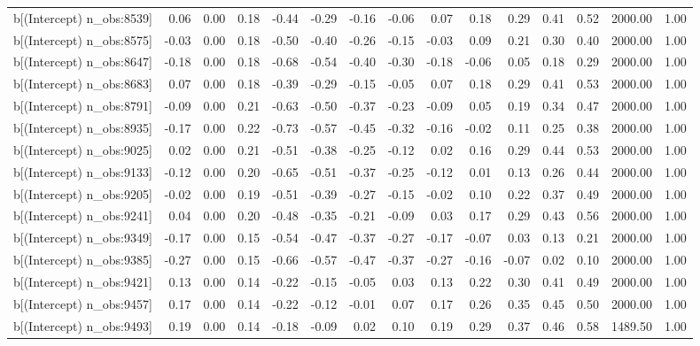 \begin{table}[ht]
\begin{tabular}{rrrrrrrrrrrrrrr}
  b[(Intercept) n\_obs:8539] & 0.06 & 0.00 & 0.18 & -0.44 & -0.29 & -0.16 & -0.06 & 0.07 & 0.18 & 0.29 & 0.41 & 0.52 & 2000.00 & 1.00 \\ 
  b[(Intercept) n\_obs:8575] & -0.03 & 0.00 & 0.18 & -0.50 & -0.40 & -0.26 & -0.15 & -0.03 & 0.09 & 0.21 & 0.30 & 0.40 & 2000.00 & 1.00 \\ 
  b[(Intercept) n\_obs:8647] & -0.18 & 0.00 & 0.18 & -0.68 & -0.54 & -0.40 & -0.30 & -0.18 & -0.06 & 0.05 & 0.18 & 0.29 & 2000.00 & 1.00 \\ 
  b[(Intercept) n\_obs:8683] & 0.07 & 0.00 & 0.18 & -0.39 & -0.29 & -0.15 & -0.05 & 0.07 & 0.18 & 0.29 & 0.41 & 0.53 & 2000.00 & 1.00 \\ 
  b[(Intercept) n\_obs:8791] & -0.09 & 0.00 & 0.21 & -0.63 & -0.50 & -0.37 & -0.23 & -0.09 & 0.05 & 0.19 & 0.34 & 0.47 & 2000.00 & 1.00 \\ 
  b[(Intercept) n\_obs:8935] & -0.17 & 0.00 & 0.22 & -0.73 & -0.57 & -0.45 & -0.32 & -0.16 & -0.02 & 0.11 & 0.25 & 0.38 & 2000.00 & 1.00 \\ 
  b[(Intercept) n\_obs:9025] & 0.02 & 0.00 & 0.21 & -0.51 & -0.38 & -0.25 & -0.12 & 0.02 & 0.16 & 0.29 & 0.44 & 0.53 & 2000.00 & 1.00 \\ 
  b[(Intercept) n\_obs:9133] & -0.12 & 0.00 & 0.20 & -0.65 & -0.51 & -0.37 & -0.25 & -0.12 & 0.01 & 0.13 & 0.26 & 0.44 & 2000.00 & 1.00 \\ 
  b[(Intercept) n\_obs:9205] & -0.02 & 0.00 & 0.19 & -0.51 & -0.39 & -0.27 & -0.15 & -0.02 & 0.10 & 0.22 & 0.37 & 0.49 & 2000.00 & 1.00 \\ 
  b[(Intercept) n\_obs:9241] & 0.04 & 0.00 & 0.20 & -0.48 & -0.35 & -0.21 & -0.09 & 0.03 & 0.17 & 0.29 & 0.43 & 0.56 & 2000.00 & 1.00 \\ 
  b[(Intercept) n\_obs:9349] & -0.17 & 0.00 & 0.15 & -0.54 & -0.47 & -0.37 & -0.27 & -0.17 & -0.07 & 0.03 & 0.13 & 0.21 & 2000.00 & 1.00 \\ 
  b[(Intercept) n\_obs:9385] & -0.27 & 0.00 & 0.15 & -0.66 & -0.57 & -0.47 & -0.37 & -0.27 & -0.16 & -0.07 & 0.02 & 0.10 & 2000.00 & 1.00 \\ 
  b[(Intercept) n\_obs:9421] & 0.13 & 0.00 & 0.14 & -0.22 & -0.15 & -0.05 & 0.03 & 0.13 & 0.22 & 0.30 & 0.41 & 0.49 & 2000.00 & 1.00 \\ 
  b[(Intercept) n\_obs:9457] & 0.17 & 0.00 & 0.14 & -0.22 & -0.12 & -0.01 & 0.07 & 0.17 & 0.26 & 0.35 & 0.45 & 0.50 & 2000.00 & 1.00 \\ 
  b[(Intercept) n\_obs:9493] & 0.19 & 0.00 & 0.14 & -0.18 & -0.09 & 0.02 & 0.10 & 0.19 & 0.29 & 0.37 & 0.46 & 0.58 & 1489.50 & 1.00 \\ 

\end{tabular}
\end{table}
